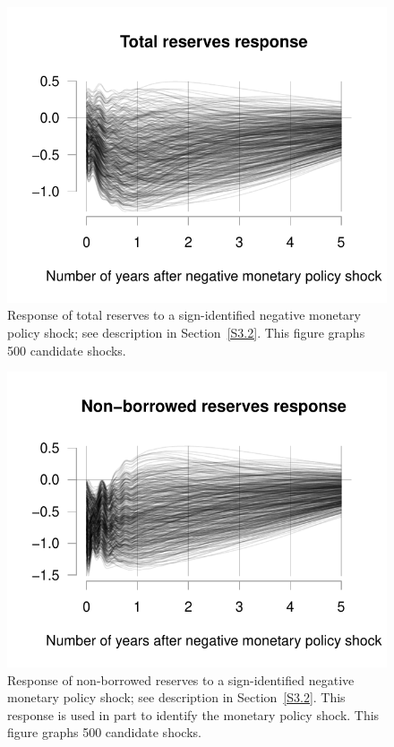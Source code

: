 \documentclass[12pt,fleqn]{article}
\begin{document}
\begin{figure}[t]
  \centering
  \includegraphics{graphs/empirics_TRES}
  \caption{%
    Response of total reserves to a sign-identified negative monetary
    policy shock; see description in Section~\ref{S3.2}. This figure
    graphs 500 candidate shocks.}
  \label{fig:9}
\end{figure}

\begin{figure}[t]
  \centering
  \includegraphics{graphs/empirics_NBREC}
  \caption{%
    Response of non-borrowed reserves to a sign-identified negative
    monetary policy shock; see description in Section~\ref{S3.2}.
    This response is used in part to identify the monetary policy
    shock. This figure graphs 500 candidate shocks.}
  \label{fig:10}
\end{figure}
\end{document}

